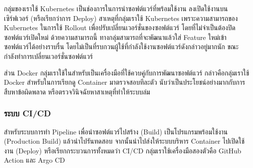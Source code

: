 \documentclass[12pt,one side,openright,a4paper]{cpe-thesis-th}
\newcommand{\thaijustify}[1]{%
  \par\hspace{30pt}\justifying
  #1
}
\begin{document}
            \thaijustify{
                กลุ่มของเราใช้ Kubernetes เป็นช่องการในการนำซอฟต์แวร์ที่พร้อมใช้งาน ลงเปิดใช้งานบนเซิร์ฟเวอร์ (หรือเรียกว่าการ Deploy) สาเหตุที่กลุ่มเราใช้ Kubernetes เพราะความสามารถของ Kubernetes ในการใช้ Rollout เพื่อปรับเปลี่ยนเวอร์ชั่นของซอฟต์แวร์ โดยที่ไม่จำเป็นต้องปิดซอฟต์แวร์เปิดใหม่ ด้วยความสามารถนี้ ทางกลุ่มสามารถที่จะพัฒนาแล้วใส่ Feature ใหม่เข้าซอฟต์แวร์ได้อย่างราบรื่น โดยไม่เป็นที่รบกวนผู้ใช้ที่กำลังใช้งานซอฟต์แวร์ดังกล่าวอยู่มากนัก ขณะกำลังทำการเปลี่ยนเวอร์ชั่นซอฟต์แวร์
            }
            \thaijustify{
                ส่วน Docker กลุ่มเราใช้ในสำหรับเป็นเครื่องมือที่ใช้ควบคู่กับการพัฒนาซอฟต์แวร์ กล่าวคือกลุ่มเราใช้ Docker สำหรับในการเรียกดู Container มาตรวจสอบทีละตัว นับว่าเป็นประโยชน์อย่างมากกับการสืบหาข้อผิดพลาด หรือตรวจวินิจฉัยหาสาเหตุที่ทำให้ระบบล่ม
            }
        \subsubsection{ระบบ CI/CD}
            \thaijustify{
                สำหรับระบบการทำ Pipeline เพื่อนำซอฟต์แวร์ไปสร้าง (Build) เป็นโปรแกรมพร้อมใช้งาน (Production Build) แล้วนำไปรันทดสอบ จากนั้นนำไปส่งให้ระบบบริหาร Container ไปเปิดใช้งาน (Deploy) หรือเรียกกระบวนการทั้งหมดว่า CI/CD กลุ่มเราใช้เครื่องมือสองตัวคือ GitHub Action และ Argo CD
            }
\end{document}
